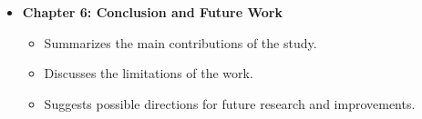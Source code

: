 \begin{itemize}
    \item \textbf{Chapter 6: Conclusion and Future Work}
    \begin{itemize}
        \item Summarizes the main contributions of the study.
        \item Discusses the limitations of the work.
        \item Suggests possible directions for future research and improvements.
    \end{itemize}

\end{itemize}


\clearpage